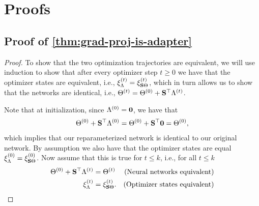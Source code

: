 \section{Proofs}
\label{sec:proofs}
\subsection{Proof of \cref{thm:grad-proj-is-adapter}}
\label{sec:proof-grad-proj-is-adapter}

\gradProjIsAdapter*
\begin{proof}
To show that the two optimization trajectories are equivalent, we will use induction to show that after every optimizer step $t \ge 0$ we have that
the optimizer states are equivalent, i.e., 
$\xi_{\Lambda}^{(t)} = \xi_{{\mathbf{S}}\Theta}^{(t)}$,
which in turn allows us to show that the networks are identical, i.e.,
$\Theta^{(t)} = \Theta^{(0)} + {\mathbf{S}}^{\top}\Lambda^{(t)}$.


Note that at initialization, since $\Lambda^{(0)} = {\mathbf{0}}$, we have that
\begin{align*}
    \Theta^{(0)} + {\mathbf{S}}^\top \Lambda^{(0)} = \Theta^{(0)} + {\mathbf{S}}^\top {\mathbf{0}} = \Theta^{(0)},
\end{align*}
which implies that our reparameterized network is identical to our original network.
By assumption we also have that the optimizer states are equal
$\xi_{\Lambda}^{(0)} = \xi_{{\mathbf{S}}\Theta}^{(0)}$. Now assume that this is true for $t \le k$, i.e., for all $t \le k$
\begin{align}
    \Theta^{(0)} + {\mathbf{S}}^\top \Lambda^{(t)} &= \Theta^{(t)} & \text{(Neural networks equivalent)}
    \label{eq:inductive-assumption-param} \\
    \xi_{\Lambda}^{(t)} &= \xi_{{\mathbf{S}}\Theta}^{(t)}. &\text{(Optimizer states equivalent)}
    \label{eq:inductive-assumption-optim-states}
\end{align}


\end{proof}
